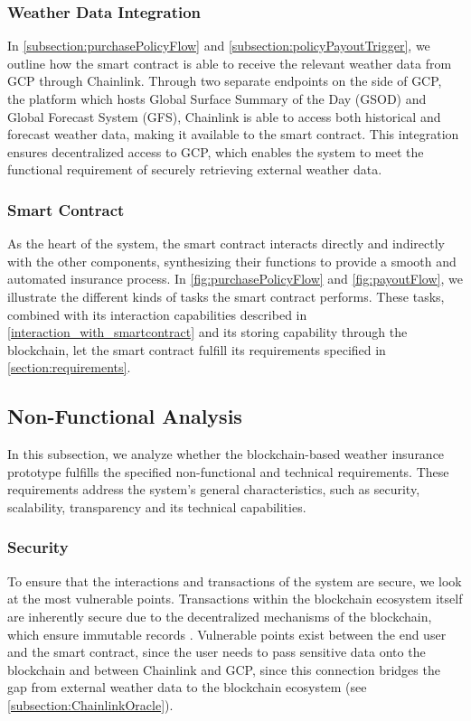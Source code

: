 \subsubsection{Weather Data Integration}
In \cref{subsection:purchasePolicyFlow} and \cref{subsection:policyPayoutTrigger}, we outline how the smart contract is able to receive the relevant weather data from GCP through Chainlink. Through two separate endpoints on the side of GCP, the platform which hosts Global Surface Summary of the Day (GSOD) and Global Forecast System (GFS), Chainlink is able to access both historical and forecast weather data, making it available to the smart contract. This integration ensures decentralized access to GCP, which enables the system to meet the functional requirement of securely retrieving external weather data.

\subsubsection{Smart Contract}
As the heart of the system, the smart contract interacts directly and indirectly with the other components, synthesizing their functions to provide a smooth and automated insurance process. In \cref{fig:purchasePolicyFlow} and \cref{fig:payoutFlow}, we illustrate the different kinds of tasks the smart contract performs. These tasks, combined with its interaction capabilities described in \cref{interaction_with_smartcontract} and its storing capability through the blockchain, let the smart contract fulfill its requirements specified in \cref{section:requirements}.

\subsection{Non-Functional Analysis}
In this subsection, we analyze whether the blockchain-based weather insurance prototype fulfills the specified non-functional and technical requirements. These requirements address the system's general characteristics, such as security, scalability, transparency and its technical capabilities.

\subsubsection{Security}
To ensure that the interactions and transactions of the system are secure, we look at the most vulnerable points. Transactions within the blockchain ecosystem itself are inherently secure due to the decentralized mechanisms of the blockchain, which ensure immutable records \autocite{Cheng2020A}. Vulnerable points exist between the end user and the smart contract, since the user needs to pass sensitive data onto the blockchain and between Chainlink and GCP, since this connection bridges the gap from external weather data to the blockchain ecosystem (see \cref{subsection:ChainlinkOracle}).

